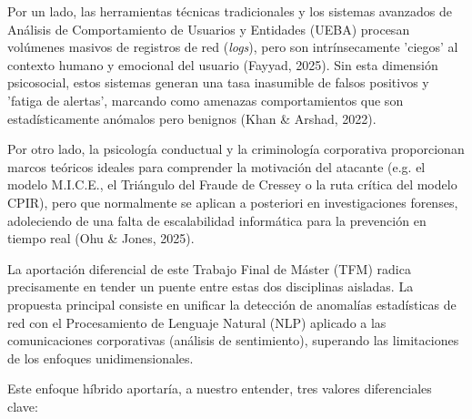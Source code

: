 \documentclass[IB]{TFUOC}%
\begin{document}
\medskip
\noindent Por un lado, las herramientas técnicas tradicionales y los sistemas avanzados de Análisis de Comportamiento de Usuarios y Entidades (UEBA) procesan volúmenes masivos de registros de red (\textit{logs}), pero son intrínsecamente 'ciegos' al contexto humano y emocional del usuario (Fayyad, 2025). Sin esta dimensión psicosocial, estos sistemas generan una tasa inasumible de falsos positivos y 'fatiga de alertas', marcando como amenazas comportamientos que son estadísticamente anómalos pero benignos (Khan \& Arshad, 2022).

\medskip
\noindent Por otro lado, la psicología conductual y la criminología corporativa proporcionan marcos teóricos ideales para comprender la motivación del atacante (e.g. el modelo M.I.C.E., el Triángulo del Fraude de Cressey o la ruta crítica del modelo CPIR), pero que normalmente se aplican a posteriori en investigaciones forenses, adoleciendo de una falta de escalabilidad informática para la prevención en tiempo real (Ohu \& Jones, 2025).

\medskip
\noindent La aportación diferencial de este Trabajo Final de Máster (TFM) radica precisamente en tender un puente entre estas dos disciplinas aisladas. La propuesta principal consiste en unificar la detección de anomalías estadísticas de red con el Procesamiento de Lenguaje Natural (NLP) aplicado a las comunicaciones corporativas (análisis de sentimiento), superando las limitaciones de los enfoques unidimensionales.

\medskip
\noindent Este enfoque híbrido aportaría, a nuestro entender, tres valores diferenciales clave:
\end{document}
